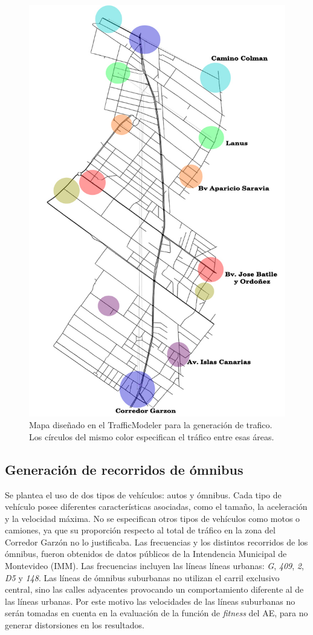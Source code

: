 \begin{figure}[ht]
	\centering
	\includegraphics[width=0.5\linewidth]{Figures/areaflow1}
	\caption[Mapa diseñado en el TrafficModeler para la generación de tráfico.]{Mapa diseñado en el TrafficModeler para la generación de trafico. Los círculos del mismo color especifican el tráfico entre esas áreas. }
	\label{fig:areaflow1}
\end{figure}

\subsection{Generación de recorridos de ómnibus}

Se plantea el uso de dos tipos de vehículos: autos y ómnibus. Cada tipo de vehículo posee diferentes características asociadas, como el tamaño, la aceleración y la velocidad máxima. No se especifican otros tipos de vehículos como motos o camiones, ya que su proporción respecto al total de tráfico en la zona del Corredor Garzón no lo justificaba. Las frecuencias y los distintos recorridos de los ómnibus, fueron obtenidos de datos públicos de la Intendencia Municipal de Montevideo (IMM). Las frecuencias incluyen las líneas líneas urbanas: \textit{G}, \textit{409}, \textit{2}, \textit{D5} y \textit{148}. Las líneas de ómnibus suburbanas no utilizan el carril exclusivo central, sino las calles adyacentes provocando un comportamiento diferente al de las líneas urbanas. Por este motivo las velocidades de las líneas suburbanas no serán tomadas en cuenta en la evaluación de la función de \emph{fitness} del AE, para no generar distorsiones en los resultados.

